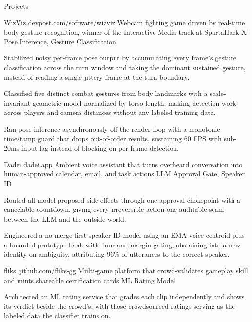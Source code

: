 \documentclass[
	11pt
]{../../../template}
\begin{document}
	\begin{rSection}{P}{rojects}
		\begin{rSectionEntry}
			{WizViz}
			{\href{https://devpost.com/software/wizviz}{devpost.com/software/wizviz}}
			{Webcam fighting game driven by real-time body-gesture recognition, winner of the Interactive Media track at SpartaHack X}
			{Pose Inference, Gesture Classification}
			{}

			\item Stabilized noisy per-frame pose output by accumulating every frame's gesture classification across the turn window and taking the dominant sustained gesture, instead of reading a single jittery frame at the turn boundary.
			\item Classified five distinct combat gestures from body landmarks with a scale-invariant geometric model normalized by torso length, making detection work across players and camera distances without any labeled training data.
			\item Ran pose inference asynchronously off the render loop with a monotonic timestamp guard that drops out-of-order results, sustaining 60 FPS with sub-20ms input lag instead of blocking on per-frame detection.
		\end{rSectionEntry}

		\begin{rSectionEntry}
			{Dadei}
			{\href{https://dadei.app}{dadei.app}}
			{Ambient voice assistant that turns overheard conversation into human-approved calendar, email, and task actions}
			{LLM Approval Gate, Speaker ID}
			{}

			\item Routed all model-proposed side effects through one approval chokepoint with a cancelable countdown, giving every irreversible action one auditable seam between the LLM and the outside world.
			\item Engineered a no-merge-first speaker-ID model using an EMA voice centroid plus a bounded prototype bank with floor-and-margin gating, abstaining into a new identity on ambiguity, attributing 96\% of utterances to the correct speaker.
		\end{rSectionEntry}

		\begin{rSectionEntry}
			{fliks}
			{\href{https://github.com/fliks-gg}{github.com/fliks-gg}}
			{Multi-game platform that crowd-validates gameplay skill and mints shareable certification cards}
			{ML Rating Model}
			{}

			\item Architected an ML rating service that grades each clip independently and shows its verdict beside the crowd's, with those crowdsourced ratings serving as the labeled data the classifier trains on.
		\end{rSectionEntry}
	\end{rSection}
\end{document}
